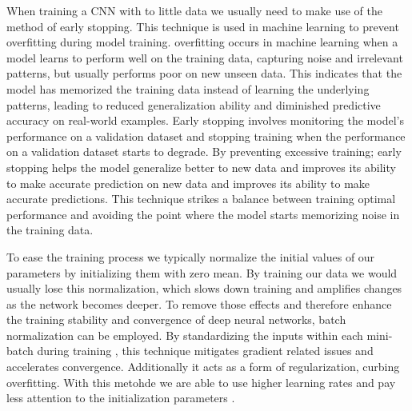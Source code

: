 \documentclass[
a4paper, 
12pt,
grayscalebody, %
abstract=on,
twoside, BCOR10mm, 12pt, DIV13,headinclude, footexclude, final, abstracton, openright
]{ibireprt}
\numberwithin{equation}{chapter}
\numberwithin{table}{chapter}
\numberwithin{figure}{chapter}
\numberwithin{algorithm}{chapter}
\numberwithin{example}{chapter}
\numberwithin{example}{chapter}
\begin{document}
When training a CNN with to little data we usually need to make use of the method of early stopping. This technique is used in machine learning to prevent overfitting during model training. overfitting occurs in machine learning when a model learns to perform well on the training data, capturing noise and irrelevant patterns, but usually performs poor on new unseen data. This indicates that the model has memorized the training data instead of learning the underlying patterns, leading to reduced generalization ability and diminished predictive accuracy on real-world examples. Early stopping involves monitoring the model's performance on a validation dataset and stopping training when the performance on a validation dataset starts to degrade. By preventing excessive training; early stopping helps the model generalize better to new data and improves its ability to make accurate prediction on new data and improves its ability to make accurate predictions.
This technique strikes a balance between training optimal performance and avoiding the point where the model starts memorizing noise in the training data. %


To ease the training process we typically normalize the initial values of our parameters by initializing them with zero mean. By training our data we would usually lose this normalization, which slows down training and amplifies changes as the network becomes deeper. %
 To remove those effects and therefore enhance the training stability and convergence of deep neural networks, batch normalization\cite{Ioffe2015} can be employed. By standardizing the inputs within each mini-batch during training , this technique mitigates gradient related issues and accelerates convergence. Additionally it acts as a form of regularization, curbing overfitting. With this metohde we are able to use higher learning rates and pay less attention to the initialization parameters \cite{Ruder2016}.  
 
\end{document}
